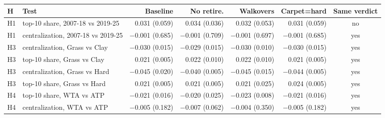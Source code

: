 \begin{tabular}{@{}llrrrrc@{}}
\toprule
H & Test & Baseline & No retire. & Walkovers & Carpet=hard & Same verdict \\
\midrule
H1 & top-10 share, 2007-18 vs 2019-25 & 0.031 (0.059) & 0.034 (0.036) & 0.032 (0.053) & 0.031 (0.059) & no \\
H1 & centralization, 2007-18 vs 2019-25 & $-$0.001 (0.685) & $-$0.001 (0.709) & $-$0.001 (0.697) & $-$0.001 (0.685) & yes \\
H3 & centralization, Grass vs Clay & $-$0.030 (0.015) & $-$0.029 (0.015) & $-$0.030 (0.010) & $-$0.030 (0.015) & yes \\
H3 & top-10 share, Grass vs Clay & 0.021 (0.005) & 0.022 (0.010) & 0.022 (0.010) & 0.021 (0.005) & yes \\
H3 & centralization, Grass vs Hard & $-$0.045 (0.020) & $-$0.040 (0.005) & $-$0.045 (0.015) & $-$0.044 (0.005) & yes \\
H3 & top-10 share, Grass vs Hard & 0.021 (0.005) & 0.021 (0.005) & 0.021 (0.025) & 0.024 (0.005) & yes \\
H4 & top-10 share, WTA vs ATP & $-$0.021 (0.016) & $-$0.020 (0.025) & $-$0.023 (0.008) & $-$0.021 (0.016) & yes \\
H4 & centralization, WTA vs ATP & $-$0.005 (0.182) & $-$0.007 (0.062) & $-$0.004 (0.350) & $-$0.005 (0.182) & yes \\
\bottomrule
\end{tabular}
